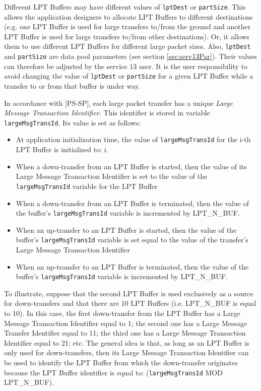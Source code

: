 \documentclass{pnp_article}
\begin{document}
Different LPT Buffers may have different values of \texttt{lptDest} or \texttt{partSize}. This allows the application designers to allocate LPT Buffers to different destinations (e.g. one LPT Buffer is used for large transfers to/from the ground and another LPT Buffer is used for large transfers to/from other destinations). Or, it allows them to use different LPT Buffers for different large packet sizes. Also, \texttt{lptDest} and \texttt{partSize} are data pool parameters (see section \ref{sec:serv13Par}). Their values can therefore be adjusted by the service 13 user. It is the user responsibility to avoid changing the value of \texttt{lptDest} or \texttt{partSize} for a given LPT Buffer while a transfer to or from that buffer is under way.

In accordance with [PS-SP], each large packet transfer has a unique \textit{Large Message Transaction Identifier}. This identifier is stored in  variable \texttt{largeMsgTransId}. Its value is set as follows:

\begin{itemize}
\item At application initialization time, the value of \texttt{largeMsgTransId} for the i-th LPT Buffer is initialized to: i.
\item When a down-transfer from an LPT Buffer is started, then the value of its Large Message Transaction Identifier is set to the value of the \texttt{largeMsgTransId} variable for the LPT Buffer
\item When a down-transfer from an LPT Buffer is terminated, then the value of the buffer's \texttt{largeMsgTransId} variable is incremented by LPT\_N\_BUF.
\item When an up-transfer to an LPT Buffer is started, then the value of the buffer's \texttt{largeMsgTransId} variable is set equal to the value of the transfer's Large Message Transaction Identifier
\item When an up-transfer to an LPT Buffer is terminated, then the value of the buffer's \texttt{largeMsgTransId} variable is incremented by LPT\_N\_BUF.
\end{itemize}

To illustrate, suppose that the second LPT Buffer is used exclusively as a source for down-transfers and that there are 10 LPT Buffers (i.e. LPT\_N\_BUF is equal to 10). In this case, the first down-transfer from the LPT Buffer has a Large Message Transaction Identifier equal to 1; the second one has a Large Message Transfer Identifier equal to 11; the third one has a Large Message Transaction Identifier equal to 21; etc. The general idea is that, as long as an LPT Buffer is only used for down-transfers, then its Large Message Transaction Identifier can be used to identify the LPT Buffer from which the down-transfer originates because the LPT Buffer identifier is equal to: (\texttt{largeMsgTransId} MOD LPT\_N\_BUF).
\end{document}
